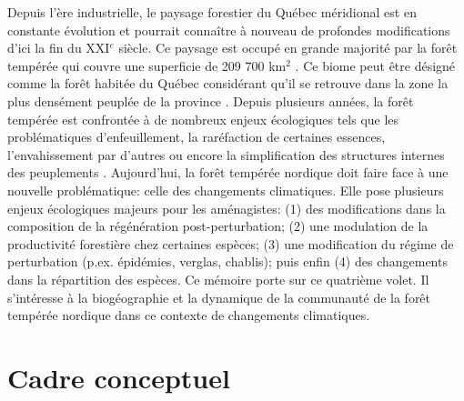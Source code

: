 
Depuis l'ère industrielle, le paysage forestier du Québec méridional est en constante évolution
\citep{Dupuis2011,Boucher2006} et pourrait connaître à nouveau de profondes modifications d'ici la
fin du XXI$^e$ siècle. Ce paysage est occupé en grande majorité par la forêt tempérée qui couvre une
superficie de 209 700 km$^2$ \citep{Boulay2015}. Ce biome peut être désigné comme la forêt habitée
du Québec considérant qu'il se retrouve dans la zone la plus densément peuplée de la province
\citep{Doyon2009}. Depuis plusieurs années, la forêt tempérée est confrontée à de
nombreux enjeux écologiques tels que les problématiques d'enfeuillement, la raréfaction de certaines
essences, l'envahissement par d’autres ou encore la simplification des structures internes des
peuplements \citep{Varady-Szabo2008}. Aujourd'hui, la forêt tempérée nordique doit faire face à une
nouvelle problématique: celle des changements climatiques. Elle pose plusieurs enjeux écologiques
majeurs pour les aménagistes: (1) des modifications dans la
composition de la régénération post-perturbation; (2) une modulation de la productivité forestière
chez certaines espèces; (3) une modification du régime de perturbation (p.ex. épidémies, verglas,
chablis); puis enfin (4) des changements dans la répartition des espèces. Ce mémoire porte sur ce
quatrième volet. Il s'intéresse à la biogéographie et la dynamique de la communauté de la forêt
tempérée nordique dans ce contexte de changements climatiques.

\section*{Cadre conceptuel}

